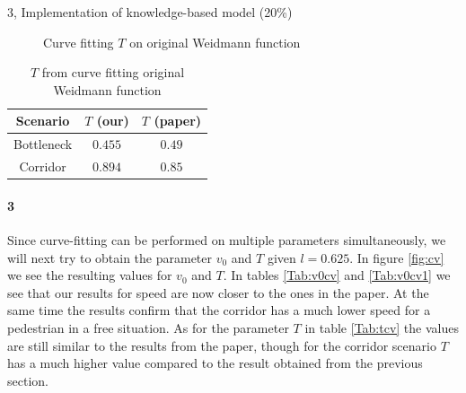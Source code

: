 \begin{task}{3, Implementation of knowledge-based model (20\%)}
\begin{figure}[H]
\centering
{}
\caption{Curve fitting $T$ on original Weidmann function}
\label{fig:cv_og}
\end{figure}

\begin{table}[H]
\centering
\begin{tabular}{ |c|c|c| }
\hline
Scenario & $T$ (our) & $T$ (paper)\\
\hline
Bottleneck & $0.455$ & $0.49$\\
\hline
Corridor & $0.894$ & $0.85$\\
\hline
\end{tabular}
\caption{$T$ from curve fitting original Weidmann function}
\label{Tab:tdens}
\end{table}

\paragraph{3}
Since curve-fitting can be performed on multiple parameters simultaneously, we will next try to obtain the parameter $v_0$ and $T$ given $l=0.625$. In figure \ref{fig:cv} we see the resulting values for $v_0$ and $T$. In tables \ref{Tab:v0cv} and \ref{Tab:v0cv1} we see that our results for speed are now closer to the ones in the paper. At the same time the results confirm that the corridor has a much lower speed for a pedestrian in a free situation. As for the parameter $T$ in table \ref{Tab:tcv} the values are still similar to the results from the paper, though for the corridor scenario $T$ has a much higher value compared to the result obtained from the previous section.


\end{task}
